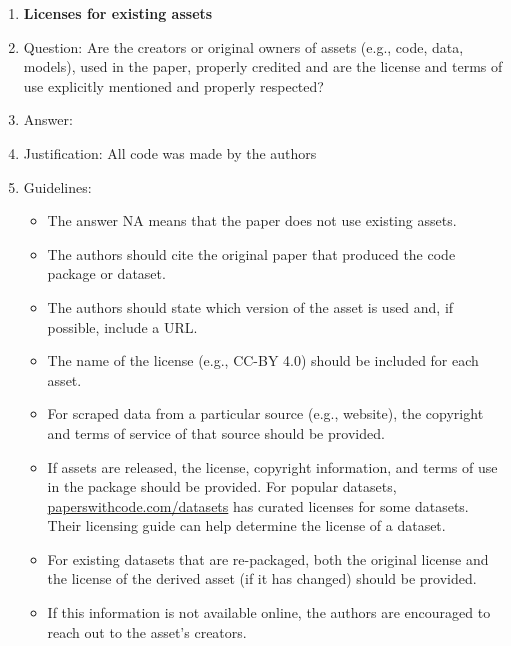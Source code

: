 \documentclass{article}
\theoremstyle{plain}
\theoremstyle{definition}
\theoremstyle{remark}
\theoremstyle{remark}
\begin{document}
\begin{enumerate}
\item {\bf Licenses for existing assets}
    \item[] Question: Are the creators or original owners of assets (e.g., code, data, models), used in the paper, properly credited and are the license and terms of use explicitly mentioned and properly respected?
    \item[] Answer: \answerNA{} %
    \item[] Justification: All code was made by the authors
    \item[] Guidelines:
    \begin{itemize}
        \item The answer NA means that the paper does not use existing assets.
        \item The authors should cite the original paper that produced the code package or dataset.
        \item The authors should state which version of the asset is used and, if possible, include a URL.
        \item The name of the license (e.g., CC-BY 4.0) should be included for each asset.
        \item For scraped data from a particular source (e.g., website), the copyright and terms of service of that source should be provided.
        \item If assets are released, the license, copyright information, and terms of use in the package should be provided. For popular datasets, \url{paperswithcode.com/datasets} has curated licenses for some datasets. Their licensing guide can help determine the license of a dataset.
        \item For existing datasets that are re-packaged, both the original license and the license of the derived asset (if it has changed) should be provided.
        \item If this information is not available online, the authors are encouraged to reach out to the asset's creators.
    \end{itemize}


\end{enumerate}
\end{document}

